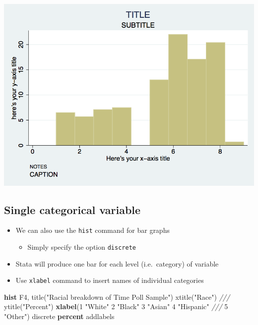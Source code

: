 \documentclass[
]{book}
\newenvironment{Shaded}{\begin{snugshade}}{\end{snugshade}}
\newcommand{\BaseNTok}[1]{\textcolor[rgb]{0.00,0.00,0.81}{#1}}
\newcommand{\CommentTok}[1]{\textcolor[rgb]{0.56,0.35,0.01}{\textit{#1}}}
\newcommand{\KeywordTok}[1]{\textcolor[rgb]{0.13,0.29,0.53}{\textbf{#1}}}
\newcommand{\NormalTok}[1]{#1}
\newcommand{\StringTok}[1]{\textcolor[rgb]{0.31,0.60,0.02}{#1}}
\providecommand{\tightlist}{%
  \setlength{\itemsep}{0pt}\setlength{\parskip}{0pt}}
\begin{document}
\includegraphics{Stata/StataGraph/images/hist2.png}

\hypertarget{single-categorical-variable}{%
\subsection{Single categorical variable}\label{single-categorical-variable}}

\begin{itemize}
\tightlist
\item
  We can also use the \texttt{hist} command for bar graphs

  \begin{itemize}
  \tightlist
  \item
    Simply specify the option \texttt{discrete}
  \end{itemize}
\item
  Stata will produce one bar for each level (i.e.~category) of variable
\item
  Use \texttt{xlabel} command to insert names of individual categories
\end{itemize}

\begin{Shaded}
\begin{Highlighting}[]
\KeywordTok{hist}\NormalTok{ F4, }\BaseNTok{title}\NormalTok{(}\StringTok{"Racial breakdown of Time Poll Sample"}\NormalTok{) }\BaseNTok{xtitle}\NormalTok{(}\StringTok{"Race"}\NormalTok{) }\CommentTok{///}
   \BaseNTok{ytitle}\NormalTok{(}\StringTok{"Percent"}\NormalTok{) }\KeywordTok{xlabel}\NormalTok{(1 }\StringTok{"White"}\NormalTok{ 2 }\StringTok{"Black"}\NormalTok{ 3 }\StringTok{"Asian"}\NormalTok{ 4 }\StringTok{"Hispanic"} \CommentTok{///}
\NormalTok{   5 }\StringTok{"Other"}\NormalTok{) discrete }\KeywordTok{percent} \BaseNTok{addlabels}
\end{Highlighting}
\end{Shaded}
\end{document}
